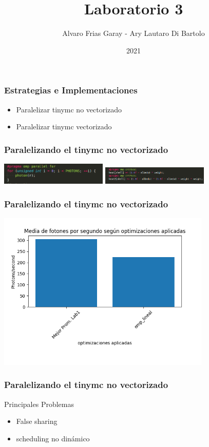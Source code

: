 \documentclass{beamer}
\title{Laboratorio 3}
\author{Alvaro Frias Garay - Ary Lautaro Di Bartolo}
\institute{Universidad Nacional de Córdoba - Universidad Nacional de Cuyo}
\date{2021}
\begin{document}
    \frame{\titlepage}

    \begin{frame}
        \frametitle{Estrategias e Implementaciones}
        \begin{itemize}
            \item Paralelizar tinymc no vectorizado
            \item Paralelizar tinymc vectorizado
        \end{itemize}
    \end{frame}

    \begin{frame}
        \frametitle{Paralelizando el tinymc no vectorizado}

        \includegraphics[width=2in]{imagenes/opt_omp_lin_1.png} \pause
        \includegraphics[width=2in]{imagenes/opt_omp_lin_2.png}
    \end{frame}

    \begin{frame}
        \frametitle{Paralelizando el tinymc no vectorizado}
        \includegraphics[width=4in]{imagenes/comp_prom_1.png}
    \end{frame}

    \begin{frame}
        \frametitle{Paralelizando el tinymc no vectorizado}
        Principales Problemas
        \begin{itemize}
            \item False sharing
            \item scheduling no dinámico
        \end{itemize}
    \end{frame}
\end{document}
